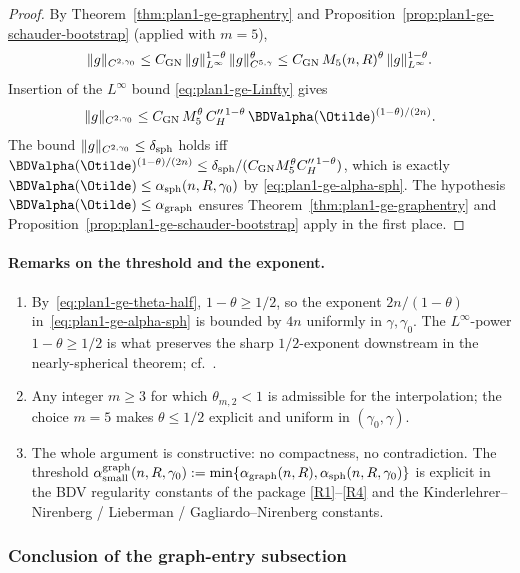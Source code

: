 \begin{proof}
By Theorem~\ref{thm:plan1-ge-graphentry} and
Proposition~\ref{prop:plan1-ge-schauder-bootstrap} (applied with
\(m=5\)),
\[
   \|g\|_{C^{2,\gamma_0}}
   \le C_{\rm GN}\,\|g\|_{L^\infty}^{1-\theta}\,
                  \|g\|_{C^{5,\gamma}}^{\theta}
   \le C_{\rm GN}\,M_5(n,R)^{\theta}\,
                  \|g\|_{L^\infty}^{1-\theta}.
\]
Insertion of the \(L^\infty\) bound \eqref{eq:plan1-ge-Linfty} gives
\[
   \|g\|_{C^{2,\gamma_0}}
   \le C_{\rm GN}\,M_5^{\theta}\,
                  C_H''^{\,1-\theta}\,
                  \BDValpha(\Otilde)^{(1-\theta)/(2n)}.
\]
The bound \(\|g\|_{C^{2,\gamma_0}}\le\delta_{\rm sph}\) holds iff
\(\BDValpha(\Otilde)^{(1-\theta)/(2n)}\le
\delta_{\rm sph}/(C_{\rm GN}M_5^{\theta}C_H''^{\,1-\theta})\), which is
exactly \(\BDValpha(\Otilde)\le\alpha_{\rm sph}(n,R,\gamma_0)\) by
\eqref{eq:plan1-ge-alpha-sph}. The hypothesis
\(\BDValpha(\Otilde)\le\alpha_{\rm graph}\) ensures
Theorem~\ref{thm:plan1-ge-graphentry} and
Proposition~\ref{prop:plan1-ge-schauder-bootstrap} apply in the first
place.
\end{proof}

\paragraph{Remarks on the threshold and the exponent.}
\begin{enumerate}
\item By~\eqref{eq:plan1-ge-theta-half}, \(1-\theta\ge 1/2\), so the
exponent \(2n/(1-\theta)\) in~\eqref{eq:plan1-ge-alpha-sph} is bounded by
\(4n\) uniformly in \(\gamma,\gamma_0\). The \(L^\infty\)-power
\(1-\theta\ge 1/2\) is what preserves the sharp \(1/2\)-exponent
downstream in the nearly-spherical theorem; cf.\
\cite[Theorem~6.4.5]{BL1976}.
\item Any integer \(m\ge 3\) for which \(\theta_{m,2}<1\) is admissible
for the interpolation; the choice \(m=5\) makes \(\theta\le 1/2\)
explicit and uniform in \((\gamma_0,\gamma)\).
\item The whole argument is constructive: no compactness, no
contradiction. The threshold
\(\alpha_{\rm small}^{\rm graph}(n,R,\gamma_0):=\min\{\alpha_{\rm graph}(n,R),
\alpha_{\rm sph}(n,R,\gamma_0)\}\) is explicit in the BDV regularity
constants of the package \ref{R1}--\ref{R4} and the
Kinderlehrer--Nirenberg / Lieberman / Gagliardo--Nirenberg constants.
\end{enumerate}

\subsubsection{Conclusion of the graph-entry subsection}

